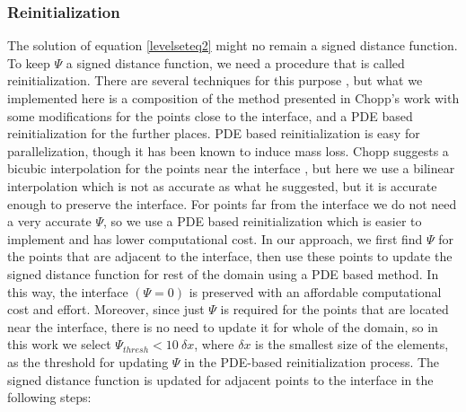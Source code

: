 \documentclass[letterpaper,10pt]{article}
\begin{document}
\subsubsection{Reinitialization} \label{reinitialization}
The solution of equation \eqref{levelseteq2} might no remain a signed distance function. To keep $\varPsi$ a signed distance function, we need a procedure that is called 
reinitialization. There are several techniques for this purpose \cite{Osher1988}, but what we implemented here is a composition of the method presented in Chopp's work \cite{Chopp2001} with 
some modifications for the points close to the interface, and a PDE based reinitialization for the further places\cite{Sussman1994a}.
PDE based reinitialization is easy for parallelization, though it has been known to induce mass loss. Chopp suggests a bicubic interpolation for the points near the interface \cite{Chopp2001},
but here we use a bilinear interpolation which is not as accurate as what he suggested, but it is accurate enough to preserve the interface. 
For points far from the interface we do not need a very accurate $\varPsi$, so we use a PDE based reinitialization which is easier to implement and has lower computational cost. 
In our approach, we first find $\varPsi$ for the points that are adjacent to the interface, then use these points to update the signed distance function for rest of the domain using a PDE based method.
In this way, the interface $( \varPsi=0 )$ is preserved with an affordable computational cost and effort. Moreover, since just $\varPsi$ is required for the points that are located near the interface, 
there is no need to update it for whole of the domain, so in this work we select $\varPsi_{thresh}<10\ \delta x$, where $\delta x$ is the smallest size of the elements, 
as the threshold for updating $\varPsi$ in the PDE-based reinitialization process.
The signed distance function is updated for adjacent points to the interface in the following steps:
\end{document}
